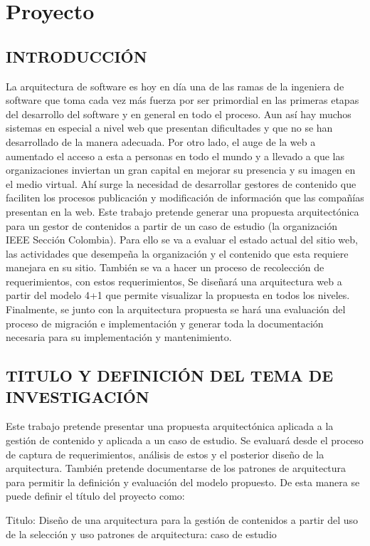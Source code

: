 \chapter{Proyecto}
\section{INTRODUCCIÓN}
La arquitectura de software es hoy en día una de las ramas de la ingeniera de software que toma cada vez más fuerza por ser primordial en las primeras etapas del desarrollo del software y en general en todo el proceso. Aun así hay muchos sistemas en especial a nivel web que presentan dificultades y que no se han desarrollado de la manera adecuada. Por otro lado, el auge de la web a aumentado el acceso a esta a personas en todo el mundo y a llevado a que las organizaciones inviertan un gran capital en mejorar su presencia y su imagen en el medio virtual. Ahí surge la necesidad de desarrollar gestores de contenido que faciliten los procesos publicación y modificación de información que las compañías presentan en la web. Este trabajo pretende generar una propuesta arquitectónica para un gestor de contenidos a partir de un caso de estudio (la organización IEEE Sección Colombia). Para ello se va a evaluar el estado actual del sitio web, las actividades que desempeña la organización y el contenido que esta requiere manejara en su sitio. También se va a hacer un proceso de recolección de requerimientos, con estos requerimientos, Se diseñará una arquitectura web a partir del modelo 4+1 que permite visualizar la propuesta en todos los niveles. Finalmente, se junto con la arquitectura propuesta se hará una evaluación del proceso de migración e implementación y generar toda la documentación necesaria para su implementación y mantenimiento.
\newpage
\section{TITULO Y DEFINICIÓN DEL TEMA DE INVESTIGACIÓN}

Este trabajo pretende presentar una propuesta arquitectónica aplicada a la gestión de contenido y aplicada a un caso de estudio. Se evaluará desde el proceso de captura de requerimientos, análisis de estos y el posterior diseño de la arquitectura. También pretende documentarse de los patrones de arquitectura para permitir la definición y evaluación del modelo propuesto. De esta manera se puede definir el título del proyecto como:


Titulo: Diseño de una arquitectura para la gestión de contenidos a partir del uso de la selección y uso patrones de arquitectura: caso de estudio
\newpage

